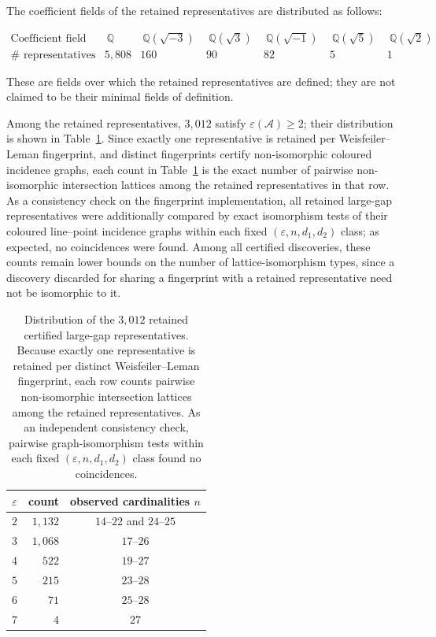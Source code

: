 \documentclass[pdflatex,sn-mathphys-num]{sn-jnl}%
\renewcommand{\epsilon}{\varepsilon}
\theoremstyle{remark}
\theoremstyle{definition}
\begin{document}
The coefficient fields of the retained representatives are distributed as
follows:

\[
\begin{array}{c|r|r|r|r|r|r}
\text{Coefficient field}
&
~\mathbb{Q}~
&
~\mathbb{Q}(\sqrt{-3})~
&
~\mathbb{Q}(\sqrt3)~
&
~\mathbb{Q}(\sqrt{-1})~
&
~\mathbb{Q}(\sqrt5)~
&
~\mathbb{Q}(\sqrt2)~
\\ \hline
\#\text{ representatives}
&
5{,}808&160&90&82&5&1
\end{array}
\]

These are fields over which the retained representatives are defined; they are not claimed to be their minimal fields of definition. 

Among the retained representatives, $3{,}012$ satisfy $\epsilon(\mathcal{A})\geq2$; their distribution is shown in Table~\ref{tab:epsilon-distribution}. Since exactly one representative is retained per Weisfeiler--Leman fingerprint, and distinct fingerprints certify non-isomorphic coloured incidence graphs, each count in Table~\ref{tab:epsilon-distribution} is the exact number of pairwise non-isomorphic intersection lattices among the retained representatives in that row. As a consistency check on the fingerprint implementation, all retained large-gap representatives were additionally compared by exact isomorphism tests of their coloured line--point incidence graphs within each fixed $(\epsilon,n,d_1,d_2)$ class; as expected, no coincidences were found. Among all certified discoveries, these counts remain lower bounds on the number of lattice-isomorphism types, since a discovery discarded for sharing a fingerprint with a retained representative need not be isomorphic to it.

\begin{table}[ht]
\centering
\caption{Distribution of the $3{,}012$ retained certified large-gap representatives. Because exactly one representative is retained per distinct Weisfeiler--Leman fingerprint, each row counts pairwise non-isomorphic intersection lattices among the retained representatives. As an independent consistency check, pairwise graph-isomorphism tests within each fixed $(\epsilon,n,d_1,d_2)$ class found no coincidences.}

\label{tab:epsilon-distribution}
\begin{tabular}{c|r|c}
\hline
$\epsilon$
&
count
&
observed cardinalities $n$
\\
\hline
$2$ & $1{,}132$ & $14$--$22$ and $24$--$25$ \\
$3$ & $1{,}068$ & $17$--$26$ \\
$4$ & $522$ & $19$--$27$ \\
$5$ & $215$ & $23$--$28$ \\
$6$ & $71$ & $25$--$28$ \\
$7$ & $4$  & $27$\\
\hline
\end{tabular}
\end{table}
\end{document}
